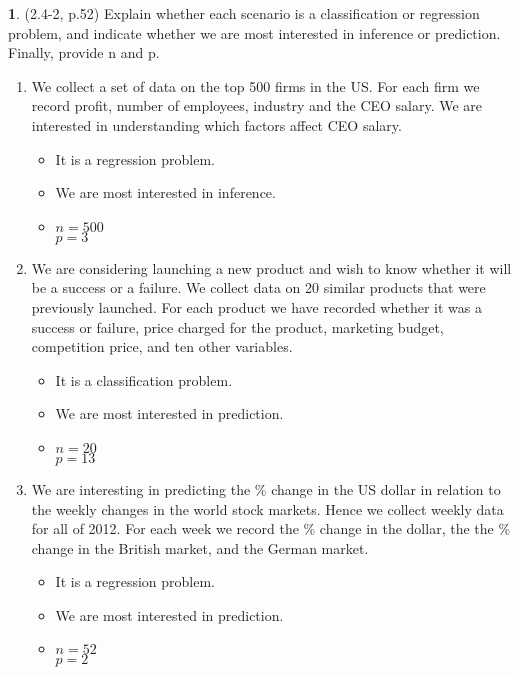\documentclass[12pt]{article}
\theoremstyle{definition}
\newtheorem{problem}{}
\begin{document}
	\begin{problem} (2.4-2, p.52) Explain whether each scenario is a classification or regression problem, and indicate whether we are most interested in inference or prediction. Finally, provide n and p.
		\begin{enumerate}
			\item We collect a set of data on the top 500 firms in the US. For each firm we record profit, number of employees, industry and the CEO salary. We are interested in understanding which factors affect CEO salary.
				\begin{itemize}
					\item It is a regression problem.
					\item We are most interested in inference.
					\item $n=500$\\$p=3$
				\end{itemize}

			\item We are considering launching a new product and wish to know whether it will be a success or a failure. We collect data on 20 similar products that were previously launched. For each product we have recorded whether it was a success or failure, price charged for the product, marketing budget, competition price, and ten other variables.
				\begin{itemize}
					\item It is a classification problem.
					\item We are most interested in prediction.
					\item $n=20$\\$p=13$
				\end{itemize}
			\item We are interesting in predicting the \% change in the US dollar in relation to the weekly changes in the world stock markets. Hence we collect weekly data for all of 2012. For each week we record the \% change in the dollar, the the \% change in the British market, and the German market.
				\begin{itemize}
					\item It is a regression problem.
					\item We are most interested in prediction.
					\item $n=52$\\$p=2$
				\end{itemize}

		\end{enumerate}
	\end{problem}
\end{document}
